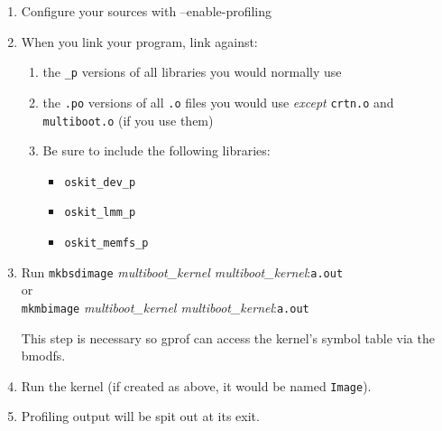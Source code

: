 \begin{enumerate}
\item Configure your sources with --enable-profiling

\item When you link your program, link against:
	\begin{enumerate}

	\item   the \texttt{_p} versions of all libraries you would normally use
        \item   the \texttt{.po} versions of all \texttt{.o} files you would use
             \emph{except} \texttt{crtn.o} and \texttt{multiboot.o} (if you use them)
	\item  Be sure to include the following libraries:
		\begin{itemize}
		\item \texttt{oskit\_dev\_p}
		\item \texttt{oskit\_lmm\_p}
		\item \texttt{oskit_memfs_p}
		\end{itemize}
	\end{enumerate}

\item Run \texttt{mkbsdimage} \emph{multiboot_kernel multiboot_kernel}:\texttt{a.out} \\
	or \\
      \texttt{mkmbimage} \emph{multiboot_kernel multiboot_kernel}:\texttt{a.out}

    This step is necessary so gprof can access the kernel's symbol
    table via the bmodfs.

\item Run the kernel (if created as above, it would be named \texttt{Image}).

\item Profiling output will be spit out at its exit.

\end{enumerate}

